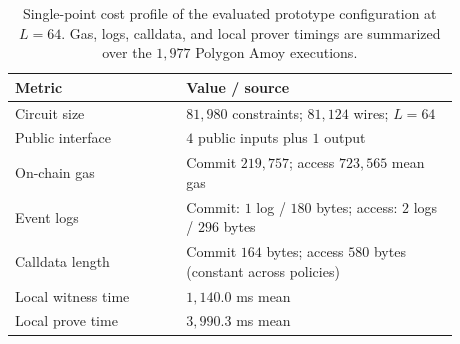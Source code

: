 \begin{table}[htbp]
	\centering
	\caption{Single-point cost profile of the evaluated prototype configuration at $L=64$.
		Gas, logs, calldata, and local prover timings are summarized over the $1{,}977$ Polygon Amoy executions.}
	\label{tab:cost-profile}
	\footnotesize
	\begin{tabular}{p{0.34\linewidth}p{0.54\linewidth}}
		\toprule
		Metric              & Value / source                                                    \\
		\midrule
		Circuit size        & $81{,}980$ constraints; $81{,}124$ wires; $L=64$        \\
		Public interface    & $4$ public inputs plus $1$ output                                 \\
		On-chain gas        & Commit $219{,}757$; access $723{,}565$ mean gas                   \\
		Event logs          & Commit: $1$ log / $180$ bytes; access: $2$ logs / $296$ bytes     \\
		Calldata length     & Commit $164$ bytes; access $580$ bytes (constant across policies) \\
		Local witness time  & $1{,}140.0$ ms mean                                               \\
		Local prove time    & $3{,}990.3$ ms mean                                               \\
		\bottomrule
	\end{tabular}
\end{table}
